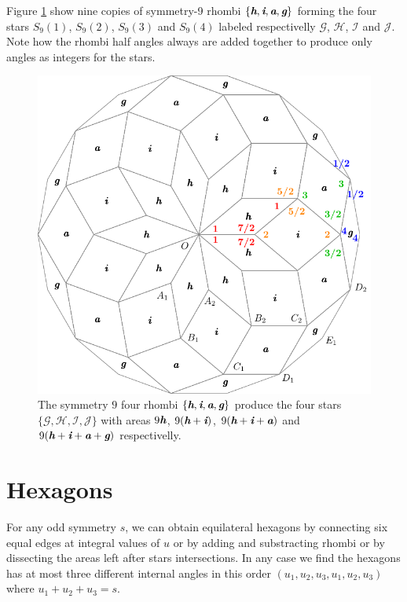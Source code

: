 \documentclass[11pt]{article}
\def\mathbi#1{\textbf{\em #1}}
\begin{document}
Figure \ref{fig:rhombi-9} show nine copies of symmetry-9 rhombi $\{\mathbi{h},\mathbi{i},\mathbi{a},\mathbi{g}\}$ forming the four stars $S_9(1)$, $S_9(2)$, $S_9(3)$ and $S_9(4)$ labeled respectivelly $\mathcal{G}$, $\mathcal{H}$, $\mathcal{I}$ and $\mathcal{J}$. Note how the rhombi half angles always are added together to produce only angles as integers for the stars.

\begin{figure}[H]
\centering
\includegraphics[scale=1]{rhombi-9}
\caption{The symmetry $9$ four rhombi $\{\mathbi{h},\mathbi{i},\mathbi{a},\mathbi{g}\}$ produce the four stars $\{\mathcal{G},\mathcal{H},\mathcal{I},\mathcal{J}\}$ with areas
$9\mathbi{h}$,
 $9(\mathbi{h}+\mathbi{i})$,
 $9(\mathbi{h}+\mathbi{i}+\mathbi{a})$ and 
 $9(\mathbi{h}+\mathbi{i}+\mathbi{a}+\mathbi{g})$ respectivelly.}
\label{fig:rhombi-9}
\end{figure}





\section{Hexagons}

For any odd symmetry $s$, we can obtain equilateral hexagons by connecting six equal edges at integral values of $u$ or by adding and substracting rhombi or by dissecting the areas left after stars intersections. In any case we find the hexagons has at most three different internal angles in this order $(u_1, u_2, u_3, u_1, u_2, u_3)$ where $u_1 + u_2 + u_3 = s$.
\end{document}
